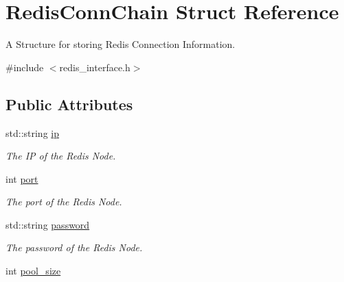 \hypertarget{structRedisConnChain}{}\section{Redis\+Conn\+Chain Struct Reference}
\label{structRedisConnChain}


A Structure for storing Redis Connection Information.  




{\ttfamily \#include $<$redis\+\_\+interface.\+h$>$}

\subsection*{Public Attributes}
\begin{DoxyCompactItemize}
\item 
std\+::string \hyperlink{structRedisConnChain_a4694dc63aa9ea1864ddd3bd32324a517}{ip}\hypertarget{structRedisConnChain_a4694dc63aa9ea1864ddd3bd32324a517}{}\label{structRedisConnChain_a4694dc63aa9ea1864ddd3bd32324a517}

\begin{DoxyCompactList}\small\item\em The IP of the Redis Node. \end{DoxyCompactList}\item 
int \hyperlink{structRedisConnChain_a5cc9c60a354a6519ab6738a97a30acf9}{port}\hypertarget{structRedisConnChain_a5cc9c60a354a6519ab6738a97a30acf9}{}\label{structRedisConnChain_a5cc9c60a354a6519ab6738a97a30acf9}

\begin{DoxyCompactList}\small\item\em The port of the Redis Node. \end{DoxyCompactList}\item 
std\+::string \hyperlink{structRedisConnChain_a8bbae840be9aab68e4c98f813915b44c}{password}\hypertarget{structRedisConnChain_a8bbae840be9aab68e4c98f813915b44c}{}\label{structRedisConnChain_a8bbae840be9aab68e4c98f813915b44c}

\begin{DoxyCompactList}\small\item\em The password of the Redis Node. \end{DoxyCompactList}\item 
int \hyperlink{structRedisConnChain_a9d8d3258596c3de62a7a71207df2617f}{pool\+\_\+size}\hypertarget{structRedisConnChain_a9d8d3258596c3de62a7a71207df2617f}{}\label{structRedisConnChain_a9d8d3258596c3de62a7a71207df2617f}


\end{DoxyCompactItemize}
